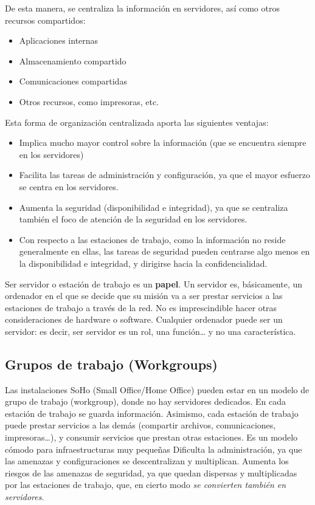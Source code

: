 \documentclass{article}
\begin{document}
De esta manera, se centraliza la información en servidores, así como otros recursos compartidos:
\begin{itemize}
\item Aplicaciones internas
\item Almacenamiento compartido
\item Comunicaciones compartidas
\item Otros recursos, como impresoras, etc.
\end{itemize}

Esta forma de organización centralizada aporta las siguientes ventajas:
\begin{itemize}
\item Implica mucho mayor control sobre la información (que se encuentra siempre en los servidores)
\item Facilita las tareas de administración y configuración, ya que el mayor esfuerzo se centra en los servidores.
\item Aumenta la seguridad (disponibilidad e integridad), ya que se centraliza también el foco de atención de la seguridad en los servidores.
\item Con respecto a las estaciones de trabajo, como la información no reside generalmente en ellas, las tareas de seguridad pueden centrarse algo menos en la disponibilidad e integridad, y dirigirse hacia la confidencialidad.
\end{itemize}

Ser servidor o estación de trabajo es un \textbf{papel}. Un servidor es, básicamente, un ordenador en el que se decide que su misión va a ser prestar servicios a las estaciones de trabajo a través de la red. No es imprescindible hacer otras consideraciones de hardware o software. Cualquier ordenador puede ser un servidor: es decir, ser servidor es un rol, una función… y no una característica.

\subsection{Grupos de trabajo (Workgroups)}
\label{sec:orga3d43d7}
Las instalaciones SoHo (Small Office/Home Office) pueden estar en un modelo de grupo de trabajo (workgroup), donde no hay servidores dedicados.
En cada estación de trabajo se guarda información.
Asimismo, cada estación de trabajo puede prestar servicios a las demás (compartir archivos, comunicaciones, impresoras…), y consumir servicios que prestan otras estaciones.
Es un modelo cómodo para infraestructuras muy pequeñas
Dificulta la administración, ya que las amenazas y configuraciones se descentralizan y multiplican.
Aumenta los riesgos de las amenazas de seguridad, ya que quedan dispersas y multiplicadas por las estaciones de trabajo, que, en cierto modo \emph{se convierten también en servidores}.
\end{document}
